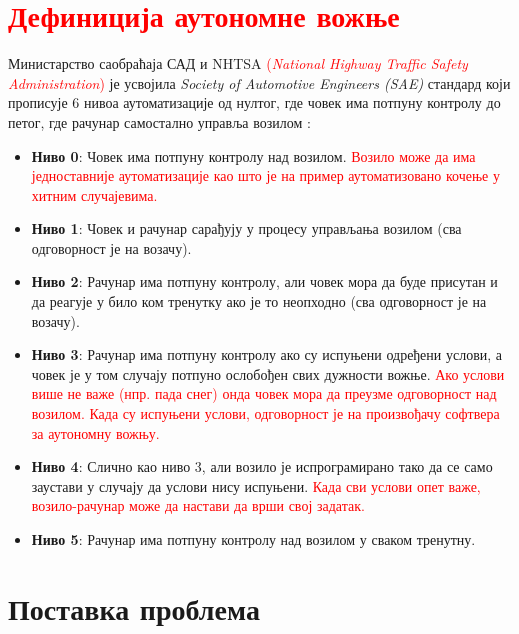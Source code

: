 \documentclass[11pt,oneside]{memoir}
\begin{document}
\section{\textcolor{red}{Дефиниција аутономне вожње}}

Министарство саобраћаја САД и NHTSA \textcolor{red}{(\textit{National Highway Traffic Safety}} \\
\textcolor{red}{\textit{Administration})} је усвојила \textit{Society of Automotive Engineers (SAE)}
стандард који прописује 6 нивоа аутоматизације од нултог, где човек има потпуну контролу до петог, где рачунар самостално управља возилом \cite{ad_survey}:
\begin{itemize}
  \item \textbf{Ниво 0}: Човек има потпуну контролу над возилом. \textcolor{red}{Возило може да има
        једноставније аутоматизације као што је на пример аутоматизовано кочење у хитним случајевима.}
  \item \textbf{Ниво 1}: Човек и рачунар сарађују у процесу управљања возилом (сва одговорност је на возачу).
  \item \textbf{Ниво 2}: Рачунар има потпуну контролу, али човек мора да буде присутан и да реагује у било ком тренутку ако је то неопходно (сва одговорност је на возачу).
  \item \textbf{Ниво 3}: Рачунар има потпуну контролу ако су испуњени одређени услови, а човек је у том случају потпуно ослобођен свих дужности вожње. 
        \textcolor{red}{Ако услови више не важе (нпр. пада снег) онда човек мора да преузме одговорност над возилом. 
         Када су испуњени услови, одговорност је на произвођачу софтвера за аутономну вожњу.}
  \item \textbf{Ниво 4}: Слично као ниво 3, али возило је испрограмирано тако да се само заустави у случају да услови нису испуњени. 
        \textcolor{red}{Када сви услови опет важе, возило-рачунар може да настави да врши свој задатак.}
  \item \textbf{Ниво 5}: Рачунар има потпуну контролу над возилом у сваком тренутну.
\end{itemize}

\section{Поставка проблема}
\end{document}
